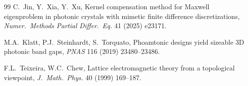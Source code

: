 \documentclass[preprint,12pt]{elsarticle}
\begin{document}
\begin{thebibliography}{99}
C.~Jin, Y.~Xia, Y.~Xu,
Kernel compensation method for Maxwell eigenproblem in photonic crystals with mimetic finite difference discretizations,
\emph{Numer.\ Methods Partial Differ.\ Eq.} 41 (2025) e23171.

M.A.~Klatt, P.J.~Steinhardt, S.~Torquato,
Phoamtonic designs yield sizeable 3D photonic band gaps,
\emph{PNAS} 116 (2019) 23480--23486.

F.L.~Teixeira, W.C.~Chew,
Lattice electromagnetic theory from a topological viewpoint,
\emph{J.\ Math.\ Phys.} 40 (1999) 169--187.

\end{thebibliography}
\end{document}
